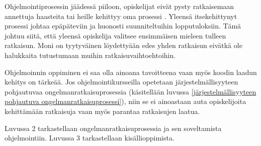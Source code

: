 Ohjelmointiprosessin jäädessä piiloon, opiskelijat eivät pysty ratkaisemaan
annettuja haasteita tai heille kehittyy oma prosessi
\cite{Caspersen:2006:NPO:1176617.1176741}. Yleensä itsekehittynyt prosessi
johtaa epäpäteviin ja huonosti suunniteltuihin lopputuloksiin. Tämä johtuu
siitä, että yleensä opiskelija valitsee ensimmäisen mieleen tulleen ratkaisun.
Moni on tyytyväinen löydettyään edes yhden ratkaisun eivätkä ole halukkaita
tutustumaan muihin ratkaisuvaihtoehtoihin.

Ohjelmoinnin oppiminen ei saa olla ainoana tavoitteena vaan myös koodin laadun
kehitys on tärkeää. Jos ohjelmointikursseilla opetetaan järjestelmällisyyteen
pohjautuvaa ongelmanratkaisuprosessia (käsitellään luvussa
\ref{järjestelmällisyyteen pohjautuva ongelmanratkaisuprosessi}), niin se ei
ainoastaan auta opiskelijoita kehittämään ratkaisuja vaan myös parantaa
ratkaisujen laatua.

Luvussa 2 tarkastellaan ongelmanratkaisuprosessia ja sen soveltamista
ohjelmointiin. Luvussa 3 tarkastellaan kisällioppimista.
